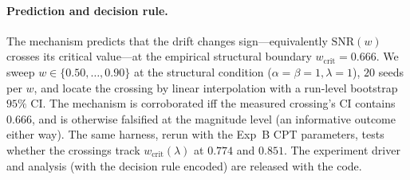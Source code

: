 \documentclass[11pt]{article}
\newcommand{\wcrit}{w_{\mathrm{crit}}}
\begin{document}
\paragraph{Prediction and decision rule.} The mechanism predicts that the
drift changes sign---equivalently $\mathrm{SNR}(w)$ crosses its critical
value---at the empirical structural boundary $\wcrit=0.666$. We sweep
$w\in\{0.50,\dots,0.90\}$ at the structural condition
($\alpha{=}\beta{=}1,\lambda{=}1$), $20$ seeds per $w$, and locate the
crossing by linear interpolation with a run-level bootstrap $95\%$ CI. The
mechanism is corroborated iff the measured crossing's CI contains $0.666$,
and is otherwise falsified at the magnitude level (an informative outcome
either way). The same harness, rerun with the Exp~B CPT parameters, tests
whether the crossings track $\wcrit(\lambda)$ at $0.774$ and $0.851$. The
experiment driver and analysis (with the decision rule encoded) are released
with the code.



\end{document}
